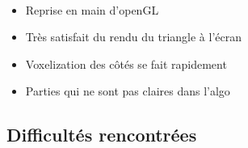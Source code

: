 \begin{frame}[fragile=singleslide]{\insertsectionhead}
  \framesubtitle{\insertsubsectionhead}
  \begin{itemize}
    \item Reprise en main d'openGL
  \end{itemize}
  \hfill
  \begin{itemize}
    \item Très satisfait du rendu du triangle à l'écran
  \end{itemize}
  \hfill
  \begin{itemize}
    \item Voxelization des côtés se fait rapidement
  \end{itemize}
  \hfill
  \begin{itemize}
    \item Parties qui ne sont pas claires dans l'algo
  \end{itemize}
  \hfill
  \begin{figure}
        \begin{subfigure}{0.6\textwidth}
        \end{subfigure}
      \end{figure}
\end{frame}

\subsection{Difficultés rencontrées}

